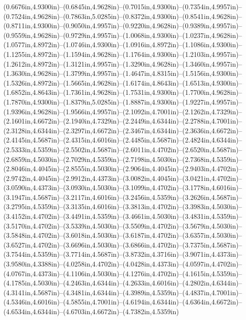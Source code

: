 (0.6676in,4.9300in)--(0.6845in,4.9628in)--(0.7015in,4.9300in)--(0.7354in,4.9957in)--(0.7524in,4.9628in)--(0.7863in,5.0285in)--(0.8372in,4.9300in)--(0.8541in,4.9628in)--(0.8711in,4.9300in)--(0.9050in,4.9957in)--(0.9220in,4.9628in)--(0.9389in,4.9957in)--(0.9559in,4.9628in)--(0.9729in,4.9957in)--(1.0068in,4.9300in)--(1.0237in,4.9628in)--(1.0577in,4.8972in)--(1.0746in,4.9300in)--(1.0916in,4.8972in)--(1.1086in,4.9300in)--(1.1255in,4.8972in)--(1.1594in,4.9628in)--(1.1764in,4.9300in)--(1.2103in,4.9957in)--(1.2612in,4.8972in)--(1.3121in,4.9957in)--(1.3290in,4.9628in)--(1.3460in,4.9957in)--(1.3630in,4.9628in)--(1.3799in,4.9957in)--(1.4647in,4.8315in)--(1.5156in,4.9300in)--(1.5326in,4.8972in)--(1.5665in,4.9628in)--(1.6174in,4.8643in)--(1.6513in,4.9300in)--(1.6852in,4.8643in)--(1.7361in,4.9628in)--(1.7531in,4.9300in)--(1.7700in,4.9628in)--(1.7870in,4.9300in)--(1.8379in,5.0285in)--(1.8887in,4.9300in)--(1.9227in,4.9957in)--(1.9396in,4.9628in)--(1.9566in,4.9957in)--(2.1092in,4.7001in)--(2.1262in,4.7329in)--(2.1601in,4.6672in)--(2.1940in,4.7329in)--(2.2449in,4.6344in)--(2.2788in,4.7001in)--(2.3128in,4.6344in)--(2.3297in,4.6672in)--(2.3467in,4.6344in)--(2.3636in,4.6672in)--(2.4145in,4.5687in)--(2.4315in,4.6016in)--(2.4485in,4.5687in)--(2.4824in,4.6344in)--(2.5333in,4.5359in)--(2.5502in,4.5687in)--(2.6011in,4.4702in)--(2.6520in,4.5687in)--(2.6859in,4.5030in)--(2.7029in,4.5359in)--(2.7198in,4.5030in)--(2.7368in,4.5359in)--(2.8046in,4.4045in)--(2.8555in,4.5030in)--(2.9064in,4.4045in)--(2.9403in,4.4702in)--(2.9742in,4.4045in)--(2.9912in,4.4373in)--(3.0082in,4.4045in)--(3.0421in,4.4702in)--(3.0590in,4.4373in)--(3.0930in,4.5030in)--(3.1099in,4.4702in)--(3.1778in,4.6016in)--(3.1947in,4.5687in)--(3.2117in,4.6016in)--(3.2456in,4.5359in)--(3.2626in,4.5687in)--(3.2795in,4.5359in)--(3.3135in,4.6016in)--(3.3813in,4.4702in)--(3.3983in,4.5030in)--(3.4152in,4.4702in)--(3.4491in,4.5359in)--(3.4661in,4.5030in)--(3.4831in,4.5359in)--(3.5170in,4.4702in)--(3.5339in,4.5030in)--(3.5509in,4.4702in)--(3.5679in,4.5030in)--(3.5848in,4.4702in)--(3.6018in,4.5030in)--(3.6187in,4.4702in)--(3.6357in,4.5030in)--(3.6527in,4.4702in)--(3.6696in,4.5030in)--(3.6866in,4.4702in)--(3.7375in,4.5687in)--(3.7544in,4.5359in)--(3.7714in,4.5687in)--(3.8732in,4.3716in)--(3.9071in,4.4373in)--(3.9580in,4.3388in)--(4.0258in,4.4702in)--(4.0428in,4.4373in)--(4.0597in,4.4702in)--(4.0767in,4.4373in)--(4.1106in,4.5030in)--(4.1276in,4.4702in)--(4.1615in,4.5359in)--(4.1785in,4.5030in)--(4.2463in,4.6344in)--(4.2633in,4.6016in)--(4.2802in,4.6344in)--(4.3141in,4.5687in)--(4.3481in,4.6344in)--(4.3989in,4.5359in)--(4.4837in,4.7001in)--(4.5346in,4.6016in)--(4.5855in,4.7001in)--(4.6194in,4.6344in)--(4.6364in,4.6672in)--(4.6534in,4.6344in)--(4.6703in,4.6672in)--(4.7382in,4.5359in)
